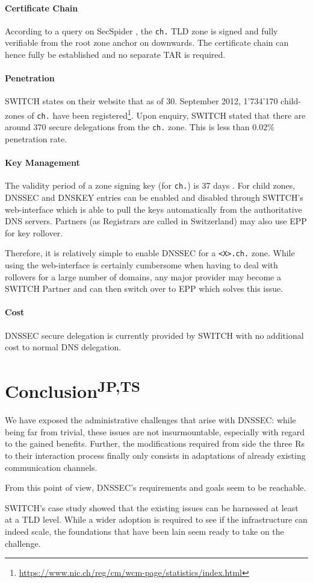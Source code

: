 \documentclass[a4paper,twocolumn]{scrartcl}
\newcommand{\wbjpts}{\textsuperscript{JP,TS}}
\begin{document}
\paragraph{Certificate Chain} According to a query on SecSpider
\cite{secspider}, the \verb|ch.| TLD zone is signed and fully
verifiable from the root zone anchor on downwards. The certificate
chain can hence fully be established and no separate TAR is required.

\paragraph{Penetration} SWITCH states on their website that as of
30. September 2012, 1'734'170 child-zones of \verb|ch.| have been
registered\footnote{\url{https://www.nic.ch/reg/cm/wcm-page/statistics/index.html}}. Upon
enquiry, SWITCH stated that there are around 370 secure delegations
from the \verb|ch.| zone. This is less than $0.02\%$ penetration
rate.

\paragraph{Key Management} The validity period of a zone signing key
(for \verb|ch.|) is 37 days \cite{switch10}. For child zones,  DNSSEC
and DNSKEY entries can be enabled and disabled through SWITCH's 
web-interface which is able to pull the keys automatically from the
authoritative DNS servers. Partners (as Registrars are called in
Switzerland) may also use EPP for key rollover.

Therefore, it is relatively simple to enable DNSSEC for a \verb|<X>.ch.| 
zone. While using the web-interface is certainly cumbersome when
having to deal with rollovers for a large number of domains, any major
provider may become a SWITCH Partner and can then switch over to EPP
which solves this issue.

\paragraph{Cost} DNSSEC secure delegation is currently provided by
SWITCH with no additional cost to normal DNS delegation.

\section{Conclusion\wbjpts}
We have exposed the administrative challenges that arise with DNSSEC:
while being far from trivial, these issues are not insurmountable,
especially with regard to the gained benefits. Further, the
modifications required from side the three Rs to their interaction
process finally only consists in adaptations of already existing
communication channels.

From this point of view, DNSSEC's requirements and goals seem to be
reachable.

SWITCH's case study showed that the existing issues can be harnessed
at least at a TLD level. While a wider adoption is required to see if
the infrastructure can indeed scale, the foundations that have been
lain seem ready to take on the challenge.

\nocite{*}


\end{document}
